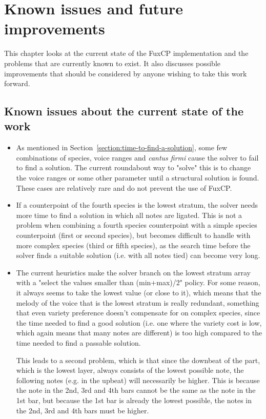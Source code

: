 \chapter{Known issues and future improvements}
This chapter looks at the current state of the FuxCP implementation and the problems that are currently known to exist. It also discusses possible improvements that should be considered by anyone wishing to take this work forward.

\section{Known issues about the current state of the work} \label{section:known-issues-about-the-current-state-of-the-work}
\begin{itemize}
  \item As mentioned in Section~\ref{section:time-to-find-a-solution}, some few combinations of species, voice ranges and \textit{cantus firmi} cause the solver to fail to find a solution. The current roundabout way to "solve" this is to change the voice ranges or some other parameter until a structural solution is found. These cases are relatively rare and do not prevent the use of FuxCP.
  \item If a counterpoint of the fourth species is the lowest stratum, the solver needs more time to find a solution in which all notes are ligated. This is not a problem when combining a fourth species counterpoint with a simple species counterpoint (first or second species), but becomes difficult to handle with more complex species (third or fifth species), as the search time before the solver finds a suitable solution (i.e. with all notes tied) can become very long.
  \item The current heuristics make the solver branch on the lowest stratum array with a "select the values smaller than (min+max)/2" policy. For some reason, it always seems to take the lowest value (or close to it), which means that the melody of the voice that is the lowest stratum is really redundant, something that even variety preference doesn't compensate for on complex species, since the time needed to find a good solution (i.e. one where the variety cost is low, which again means that many notes are different) is too high compared to the time needed to find a passable solution.
  
  This leads to a second problem, which is that since the downbeat of the part, which is the lowest layer, always consists of the lowest possible note, the following notes (e.g. in the upbeat) will necessarily be higher. This is because the note in the 2nd, 3rd and 4th bars cannot be the same as the note in the 1st bar, but because the 1st bar is already the lowest possible, the notes in the 2nd, 3rd and 4th bars must be higher. 
  

\end{itemize}
